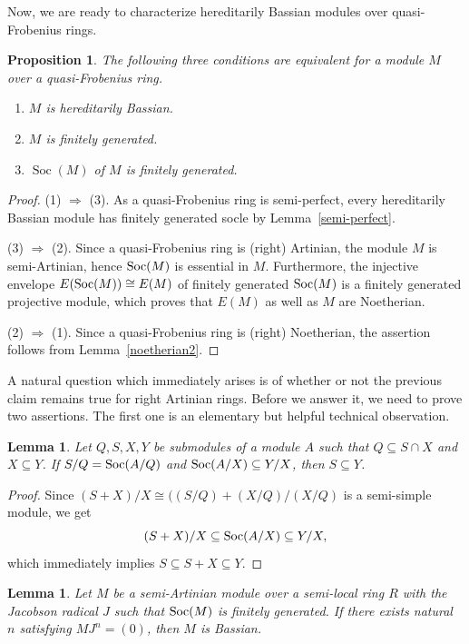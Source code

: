 \documentclass{amsart}
\newtheorem{lm}[thm]{Lemma}
\newtheorem{prop}[thm]{Proposition}
\theoremstyle{definition}
\DeclareMathOperator{\Soc}{\rm Soc}
\begin{document}
Now, we are ready to characterize hereditarily Bassian modules over quasi-Frobenius rings.

\begin{prop}\label{qF} The following three conditions are equivalent for a module $M$ over a quasi-Frobenius ring.
\begin{enumerate}
\item $M$ is hereditarily Bassian.
\item $M$ is finitely generated.
\item $\operatorname{Soc}(M)$ of $M$ is finitely generated.
\end{enumerate}	
\end{prop}

\begin{proof}
(1) $\Rightarrow$ (3). As a quasi-Frobenius ring is semi-perfect, every hereditarily Bassian module has finitely generated socle by Lemma~\ref{semi-perfect}.

(3) $\Rightarrow$ (2). Since a quasi-Frobenius ring is (right) Artinian, the module $M$ is semi-Artinian, hence $\Soc(M)$ is essential in $M$. Furthermore, the injective envelope $E(\Soc(M))\cong E(M)$ of finitely generated $\Soc(M)$ is a finitely generated projective module, which proves that $E(M)$ as well as $M$ are Noetherian.

(2) $\Rightarrow$ (1). Since a quasi-Frobenius ring is (right) Noetherian, the assertion follows from Lemma~\ref{noetherian2}.
\end{proof}

A natural question which immediately arises is of whether or not the previous claim remains true for right Artinian rings. Before we answer it, we need to prove two  assertions. The first one is an elementary but helpful technical observation.

\begin{lm}\label{step} Let $Q,S,X,Y$ be submodules of a module $A$ such that $Q\subseteq S\cap X$ and $X\subseteq Y$. If $S/Q=\Soc(A/Q)$ and $\Soc(A/X)\subseteq Y/X$, then $S\subseteq Y$.
\end{lm}

\begin{proof} Since $(S+X)/X\cong ((S/Q)+(X/Q)/(X/Q)$ is a semi-simple module, we get
\[(S+X)/X\subseteq \Soc(A/X)\subseteq Y/X,
\]
which immediately implies $S\subseteq S+X\subseteq  Y$.
\end{proof}

\begin{lm}\label{semiart} Let $M$ be a semi-Artinian module over a semi-local ring $R$ with the Jacobson radical $J$ such that $\Soc(M)$ is finitely generated. If there exists natural $n$ satisfying $MJ^n=(0)$, then $M$ is Bassian.
\end{lm}
\end{document}
